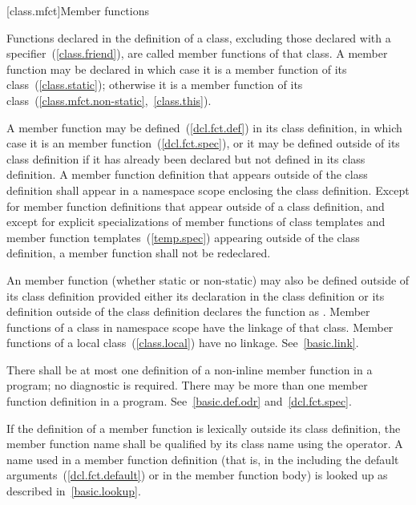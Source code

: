 [class.mfct]{Member functions}%

\pnum
Functions declared in the definition of a class, excluding those
declared with a  specifier~(\ref{class.friend}), are
called member functions of that class. A member function may be declared
 in which case it is a  member function
of its class~(\ref{class.static}); otherwise it is a
 member function of its
class~(\ref{class.mfct.non-static},~\ref{class.this}).

\pnum
{}%
%
A member function may be defined~(\ref{dcl.fct.def}) in its class
definition, in which case it is an  member
function~(\ref{dcl.fct.spec}), or it may be defined outside of its class
definition if it has already been declared but not defined in its class
definition. A member function definition that appears outside of the
class definition shall appear in a namespace scope enclosing the class
definition. Except for member function definitions that appear outside
of a class definition, and except for explicit specializations of member
functions of class templates and member function
templates~(\ref{temp.spec}) appearing outside of the class definition, a
member function shall not be redeclared.

\pnum
An  member function (whether static or non-static) may
also be defined outside of its class definition provided either its
declaration in the class definition or its definition outside of the
class definition declares the function as .
\enternote
Member functions of a class in namespace scope have the linkage of that class.
Member functions of a local class~(\ref{class.local}) have no linkage.
See~\ref{basic.link}.
\exitnote

\pnum
There shall be at most one definition of a non-inline member function in
a program; no diagnostic is required. There may be more than one
 member function definition in a program.
See~\ref{basic.def.odr} and~\ref{dcl.fct.spec}.

\pnum
{}%
If the definition of a member function is lexically outside its class
definition, the member function name shall be qualified by its class
name using the \tcode{::} operator.
\enternote
A name used in a member function definition (that is, in the
 including the default
arguments~(\ref{dcl.fct.default}) or in the member function body) is looked up
as described in~\ref{basic.lookup}.
\exitnote
\enterexample

